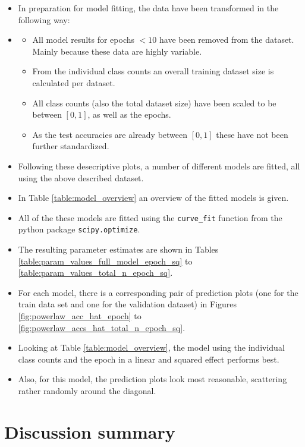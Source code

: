 \documentclass{article} %
\begin{document}
\begin{itemize}
    \item In preparation for model fitting, the data have been transformed in the following way:
    \item \begin{itemize}
              \item All model results for epochs $< 10$ have been removed from the dataset. Mainly because these data are highly variable.
              \item From the individual class counts an overall training dataset size is calculated per dataset.
              \item All class counts (also the total dataset size) have been scaled to be between $[0, 1]$, as well as the epochs.
              \item As the test accuracies are already between $[0,1]$ these have not been further standardized.
          \end{itemize}
    \item Following these desecriptive plots, a number of different models are fitted, all using the above described dataset.
    \item In Table \ref{table:model_overview} an overview of the fitted models is given.
    \item All of the these models are fitted using the \verb|curve_fit| function from the python package \verb|scipy.optimize|.
    \item The resulting parameter estimates are shown in Tables \ref{table:param_values_full_model_epoch_sq} to \ref{table:param_values_total_n_epoch_sq}.
    \item For each model, there is a corresponding pair of prediction plots (one for the train data set and one for the validation dataset) in Figures \ref{fig:powerlaw_acc_hat_epoch} to \ref{fig:powerlaw_accs_hat_total_n_epoch_sq}.
    \item Looking at Table \ref{table:model_overview}, the model using the individual class counts and the epoch in a linear and squared effect performs best.
    \item Also, for this model, the prediction plots look most reasonable, scattering rather randomly around the diagonal.
\end{itemize}

\section{Discussion summary}
\end{document}
